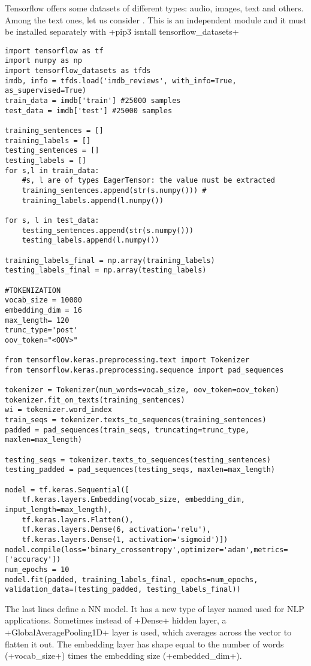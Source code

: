 Tensorflow offers some datasets of different types: audio, images, text and others. Among the text ones, let us consider . This is an independent module and it must be installed separately with \cd+pip3 isntall tensorflow_datasets+
\begin{lstlisting}
import tensorflow as tf
import numpy as np
import tensorflow_datasets as tfds
imdb, info = tfds.load('imdb_reviews', with_info=True, as_supervised=True)
train_data = imdb['train'] #25000 samples
test_data = imdb['test'] #25000 samples

training_sentences = []
training_labels = []
testing_sentences = []
testing_labels = []
for s,l in train_data:
    #s, l are of types EagerTensor: the value must be extracted
    training_sentences.append(str(s.numpy())) #
    training_labels.append(l.numpy())

for s, l in test_data:
    testing_sentences.append(str(s.numpy()))
    testing_labels.append(l.numpy())

training_labels_final = np.array(training_labels)
testing_labels_final = np.array(testing_labels)

#TOKENIZATION
vocab_size = 10000
embedding_dim = 16
max_length= 120
trunc_type='post'
oov_token="<OOV>"

from tensorflow.keras.preprocessing.text import Tokenizer
from tensorflow.keras.preprocessing.sequence import pad_sequences

tokenizer = Tokenizer(num_words=vocab_size, oov_token=oov_token)
tokenizer.fit_on_texts(training_sentences)
wi = tokenizer.word_index
train_seqs = tokenizer.texts_to_sequences(training_sentences)
padded = pad_sequences(train_seqs, truncating=trunc_type, maxlen=max_length)

testing_seqs = tokenizer.texts_to_sequences(testing_sentences)
testing_padded = pad_sequences(testing_seqs, maxlen=max_length)

model = tf.keras.Sequential([
	tf.keras.layers.Embedding(vocab_size, embedding_dim, input_length=max_length),
	tf.keras.layers.Flatten(),
	tf.keras.layers.Dense(6, activation='relu'),
	tf.keras.layers.Dense(1, activation='sigmoid')])
model.compile(loss='binary_crossentropy',optimizer='adam',metrics=['accuracy'])
num_epochs = 10
model.fit(padded, training_labels_final, epochs=num_epochs, validation_data=(testing_padded, testing_labels_final))
\end{lstlisting}

The last lines define a NN model. It has a new type of layer named  used for NLP applications. Sometimes instead of \cd+Dense+ hidden layer, a \cd+GlobalAveragePooling1D+ layer is used, which averages across the vector to flatten it out. The embedding layer has shape equal to the number of words (\cd+vocab_size+) times the embedding size (\cd+embedded_dim+).

